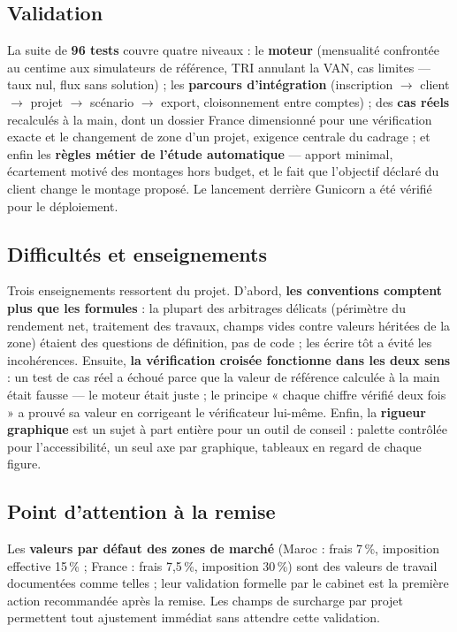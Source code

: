 \documentclass[11pt,a4paper]{article}
\begin{document}
\subsection{Validation}
La suite de \textbf{96 tests} couvre quatre niveaux : le \textbf{moteur} (mensualité confrontée au centime aux simulateurs de référence, TRI annulant la VAN, cas limites — taux nul, flux sans solution) ; les \textbf{parcours d'intégration} (inscription $\rightarrow$ client $\rightarrow$ projet $\rightarrow$ scénario $\rightarrow$ export, cloisonnement entre comptes) ; des \textbf{cas réels} recalculés à la main, dont un dossier France dimensionné pour une vérification exacte et le changement de zone d'un projet, exigence centrale du cadrage ; et enfin les \textbf{règles métier de l'étude automatique} — apport minimal, écartement motivé des montages hors budget, et le fait que l'objectif déclaré du client change le montage proposé. Le lancement derrière Gunicorn a été vérifié pour le déploiement.


\subsection{Difficultés et enseignements}
Trois enseignements ressortent du projet. D'abord, \textbf{les conventions comptent plus que les formules} : la plupart des arbitrages délicats (périmètre du rendement net, traitement des travaux, champs vides contre valeurs héritées de la zone) étaient des questions de définition, pas de code ; les écrire tôt a évité les incohérences. Ensuite, \textbf{la vérification croisée fonctionne dans les deux sens} : un test de cas réel a échoué parce que la valeur de référence calculée à la main était fausse — le moteur était juste ; le principe « chaque chiffre vérifié deux fois » a prouvé sa valeur en corrigeant le vérificateur lui-même. Enfin, la \textbf{rigueur graphique} est un sujet à part entière pour un outil de conseil : palette contrôlée pour l'accessibilité, un seul axe par graphique, tableaux en regard de chaque figure.

\subsection{Point d'attention à la remise}
Les \textbf{valeurs par défaut des zones de marché} (Maroc : frais 7\,\%, imposition effective 15\,\% ; France : frais 7,5\,\%, imposition 30\,\%) sont des valeurs de travail documentées comme telles ; leur validation formelle par le cabinet est la première action recommandée après la remise. Les champs de surcharge par projet permettent tout ajustement immédiat sans attendre cette validation.
\end{document}
